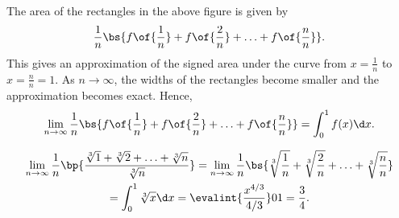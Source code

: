 \begin{solution}
\begin{ppart}
\begin{center}
        \end{center}

        The area of the rectangles in the above figure is given by \[\frac1n \bs{f\of{\frac1n} + f\of{\frac2n} + \ldots + f\of{\frac{n}{n}}}.\] This gives an approximation of the signed area under the curve from $x = \frac1n$ to $x = \frac{n}{n} = 1$. As $n \to \infty$, the widths of the rectangles become smaller and the approximation becomes exact. Hence, \[\lim_{n \to \infty} \frac1n \bs{f\of{\frac1n} + f\of{\frac2n} + \ldots + f\of{\frac{n}{n}}} = \int_0^1 f(x) \d x.\]
    \end{ppart}
    \begin{ppart}
        \begin{gather*}
            \lim_{n \to \infty} \frac1n \bp{\frac{\sqrt[3]1 + \sqrt[3]2 + \ldots + \sqrt[3]n}{\sqrt[3]n}} = \lim_{n \to \infty} \frac1n \bs{\sqrt[3]{\frac1n} + \sqrt[3]{\frac2n} + \ldots + \sqrt[3]{\frac{n}{n}}}\\ = \int_0^1 \sqrt[3]{x} \d x = \evalint{\frac{x^{4/3}}{4/3}}01 = \frac34.
        \end{gather*}
    \end{ppart}
\end{solution}

